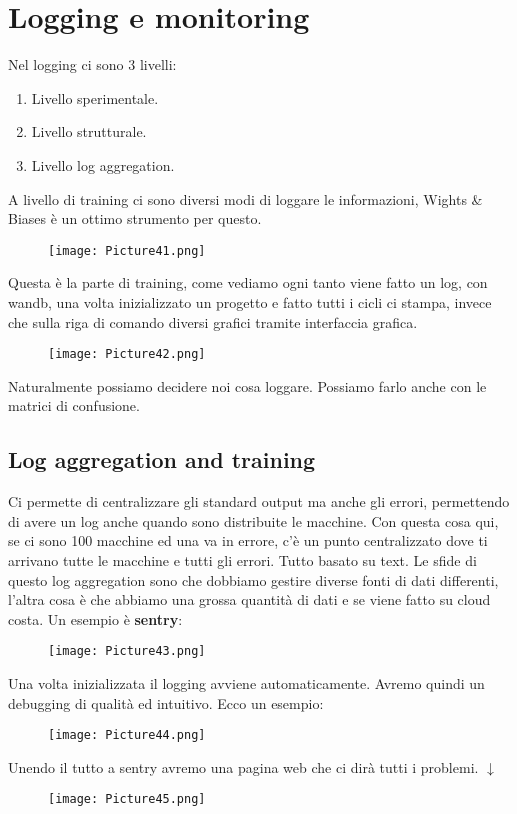 \documentclass[a4paper,12pt]{article}
\begin{document}
\section{Logging e monitoring}
Nel logging ci sono 3 livelli:
\begin{enumerate}
    \item Livello sperimentale.
    \item Livello strutturale.
    \item Livello log aggregation.
\end{enumerate}
A livello di training ci sono diversi modi di loggare le informazioni, Wights \& Biases è un ottimo strumento per questo.
\begin{figure}[H]
    \centering
    \texttt{[image: Picture41.png]}
\end{figure}
\noindent Questa è la parte di training, come vediamo ogni tanto viene fatto un log, con wandb, una volta inizializzato un progetto e fatto tutti i cicli ci stampa, invece che sulla riga di comando diversi grafici tramite interfaccia grafica.
\begin{figure}[H]
    \centering
    \texttt{[image: Picture42.png]}
\end{figure}
\noindent Naturalmente possiamo decidere noi cosa loggare. Possiamo farlo anche con le matrici di confusione. 

\subsection{Log aggregation and training}
Ci permette di centralizzare gli standard output ma anche gli errori, permettendo di avere un log anche quando sono distribuite le macchine. Con questa cosa qui, se ci sono 100 macchine ed una va in errore, c'è un punto centralizzato dove ti arrivano tutte le macchine e tutti gli errori.
Tutto basato su text. Le sfide di questo log aggregation sono che dobbiamo gestire diverse fonti di dati differenti, l'altra cosa è che abbiamo una grossa quantità di dati e se viene fatto su cloud costa.
Un esempio è \textbf{sentry}:
\begin{figure}[H]
    \centering
    \texttt{[image: Picture43.png]}
\end{figure}
\noindent Una volta inizializzata il logging avviene automaticamente. Avremo quindi un debugging di qualità ed intuitivo. 
Ecco un esempio:
\begin{figure}[H]
    \centering
    \texttt{[image: Picture44.png]}
\end{figure}
\begin{center}
    Unendo il tutto a sentry avremo una pagina web che ci dirà tutti i problemi.
    $\downarrow$
\end{center}
\begin{figure}[H]
    \centering
    \texttt{[image: Picture45.png]}
\end{figure}
\end{document}
